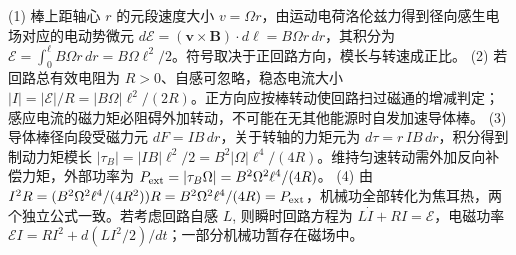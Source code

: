 (1) 棒上距轴心 \(r\) 的元段速度大小 \(v=\Omega r\)，由运动电荷洛伦兹力得到径向感生电场对应的电动势微元 \(d\mathcal E=(\boldsymbol v\times\boldsymbol B)\cdot d\boldsymbol\ell=B\Omega r\,dr\)，其积分为 \(\mathcal E=\int_0^\ell B\Omega r\,dr=B\Omega\ell^2/2\)。符号取决于正回路方向，模长与转速成正比。
(2) 若回路总有效电阻为 \(R>0\)、自感可忽略，稳态电流大小 \(|I|=|\mathcal E|/R=|B\Omega|\ell^2/(2R)\)。正方向应按棒转动使回路扫过磁通的增减判定；感应电流的磁力矩必阻碍外加转动，不可能在无其他能源时自发加速导体棒。
(3) 导体棒径向段受磁力元 \(dF=IB\,dr\)，关于转轴的力矩元为 \(d\tau=r\,IB\,dr\)，积分得到制动力矩模长 \(|\tau_B|=|I B|\ell^2/2=B^2|\Omega|\ell^4/(4R)\)。维持匀速转动需外加反向补偿力矩，外部功率为 \(P_{\rm ext}=|\tau_B\Omega|=B^2\Omega^2\ell^4/(4R)\)。
(4) 由 \(I^2R=(B^2\Omega^2\ell^4/(4R^2))R=B^2\Omega^2\ell^4/(4R)=P_{\rm ext}\)，机械功全部转化为焦耳热，两个独立公式一致。若考虑回路自感 \(L\), 则瞬时回路方程为 \(L\dot I+RI=\mathcal E\)，电磁功率 \(\mathcal E I=RI^2+d(LI^2/2)/dt\)；一部分机械功暂存在磁场中。
